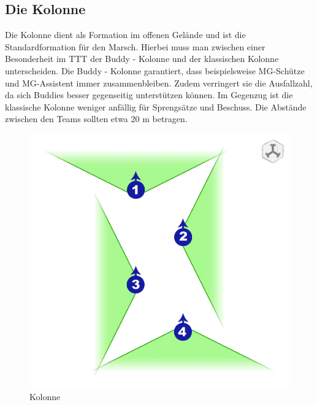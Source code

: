 \subsection{Die Kolonne}
Die Kolonne dient als Formation im offenen Gelände und ist die Standardformation für den Marsch. Hierbei muss man zwischen einer Besonderheit im \ac{TTT} der Buddy - Kolonne und der klassischen Kolonne unterscheiden. Die Buddy - Kolonne garantiert, dass beispielsweise MG-Schütze und MG-Assistent immer zusammenbleiben. Zudem verringert sie die Ausfallzahl, da sich Buddies besser gegenseitig unterstützen können. Im Gegenzug ist die klassische Kolonne weniger anfällig für Sprengsätze und Beschuss. Die Abstände zwischen den Teams sollten etwa 20 m betragen.\\
\begin{figure}[htbp]
	\centering
	\begin{minipage}[t]{7 cm}
		\includegraphics[width=1\linewidth]{./img/grundlagen/formationen/kolonne_4mann.jpg}
		\caption{Kolonne}
		\label{K4M}
	\end{minipage}
	\begin{minipage}[t]{7 cm}

\end{minipage}
\end{figure}
